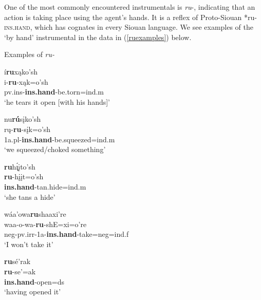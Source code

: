 \label{ParaByHand}

One of the most commonly encountered instrumentals is \textit{ru}-, indicating that an action is taking place using the agent's hands. It is a reflex of Proto-Siouan *ru- \textsc{ins.hand}, which has cognates in every Siouan language. We see examples of the `by hand' instrumental in the data in (\ref{ruexamples}) below.

\begin{exe}
\item\label{ruexamples} Examples of \textit{ru-}

	\begin{xlist}
	
	\item \glll í\textbf{ru}xąko'sh\\
	i-\textbf{ru}-xąk=o'sh\\
	pv.ins-\textbf{ins.hand}-\textnormal{be.torn}=ind.m\\
	\glt `he tears it open [with his hands]' \citep[309]{hollow1970}
	
	\item \glll nu\textbf{rú}sįko'sh\\
	rų-\textbf{ru}-sįk=o'sh\\
	1a.pl-\textbf{ins.hand}-\textnormal{be.squeezed}=ind.m\\
	\glt `we squeezed/choked something' \citep[206]{hollow1970}
	
	\item \glll \textbf{ru}h\'{ı̨}įto'sh\\
	\textbf{ru}-hįįt=o'sh\\
	\textbf{ins.hand}-\textnormal{tan.hide}=ind.m\\
	\glt 	`she tans a hide' \citep[75]{hollow1970}
		
	\item \glll wáa'owa\textbf{ru}shaaxi're\\
	waa-o-wa-\textbf{ru}-shE=xi=o're\\
	neg-pv.irr-1a-\textbf{ins.hand}-\textnormal{take}=neg=ind.f\\
	\glt `I won't take it' \citep[131]{hollow1973a}
	
	\item \glll \textbf{ru}sé'rak\\
	\textbf{ru}-se'=ak\\
	\textbf{ins.hand}-\textnormal{open}=ds\\
	\glt `having opened it' \citep[137]{hollow1973a}
	

\end{xlist}
\end{exe}
